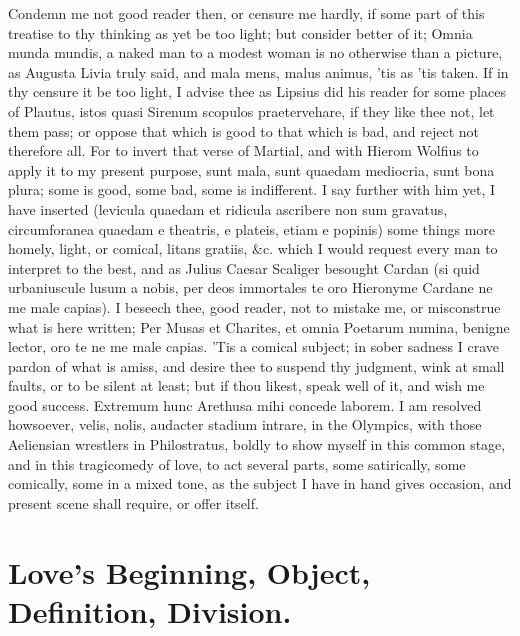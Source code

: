 {Condemn me not good reader then, or censure me hardly, if some part of
this treatise to thy thinking as yet be too light; but consider better
of it; Omnia munda mundis, a naked man to a modest woman is no
otherwise than a picture, as Augusta Livia truly said, and mala
mens, malus animus, 'tis as 'tis taken. If in thy censure it be too
light, I advise thee as Lipsius did his reader for some places of
Plautus, istos quasi Sirenum scopulos praetervehare, if they like thee
not, let them pass; or oppose that which is good to that which is bad,
and reject not therefore all. For to invert that verse of Martial, and
with Hierom Wolfius to apply it to my present purpose, sunt mala, sunt
quaedam mediocria, sunt bona plura; some is good, some bad, some is
indifferent. I say further with him yet, I have inserted
(levicula quaedam et ridicula ascribere non sum gravatus,
circumforanea quaedam e theatris, e plateis, etiam e popinis) some
things more homely, light, or comical, litans gratiis, \&c. which I
would request every man to interpret to the best, and as Julius Caesar
Scaliger besought Cardan (si quid urbaniuscule lusum a nobis, per deos
immortales te oro Hieronyme Cardane ne me male capias). I beseech thee,
good reader, not to mistake me, or misconstrue what is here written;
Per Musas et Charites, et omnia Poetarum numina, benigne lector, oro te
ne me male capias. 'Tis a comical subject; in sober sadness I crave
pardon of what is amiss, and desire thee to suspend thy judgment, wink
at small faults, or to be silent at least; but if thou likest, speak
well of it, and wish me good success. Extremum hunc Arethusa mihi
concede laborem.
I am resolved howsoever, velis, nolis, audacter stadium intrare, in the
Olympics, with those Aeliensian wrestlers in Philostratus, boldly to
show myself in this common stage, and in this tragicomedy of love, to
act several parts, some satirically, some comically, some in a mixed
tone, as the subject I have in hand gives occasion, and present scene
shall require, or offer itself.

\section{Love's Beginning, Object, Definition, Division.}

}
